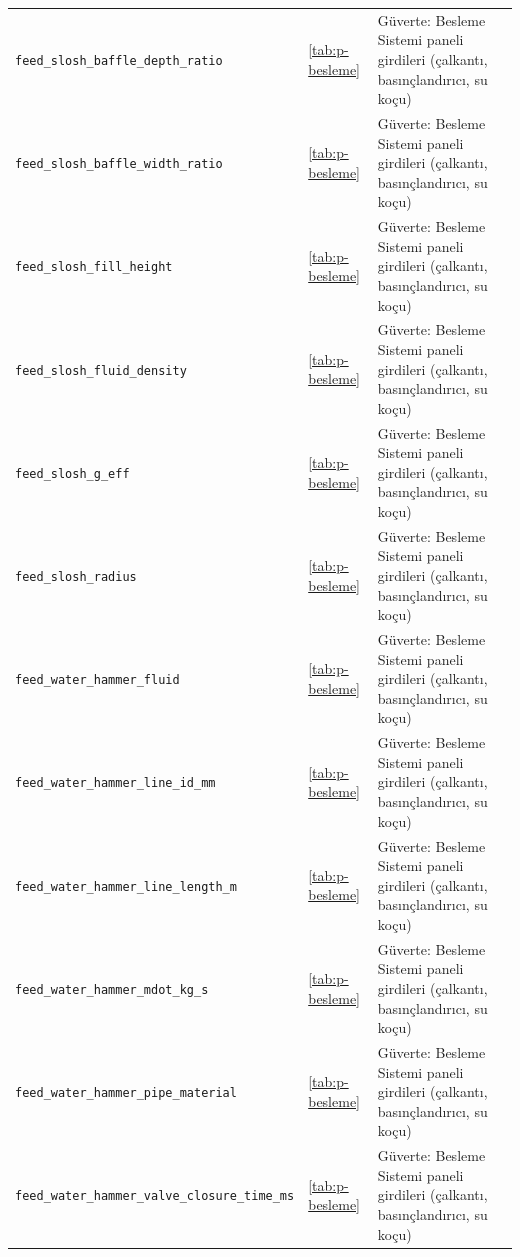 \documentclass[11pt,a4paper]{article}
\begin{document}
{\begin{longtable}{@{}>{\raggedright\arraybackslash}p{5.2cm}p{1.4cm}>{\raggedright\arraybackslash}p{7.4cm}@{}}
\texttt{feed\_\allowbreak{}slosh\_\allowbreak{}baffle\_\allowbreak{}depth\_\allowbreak{}ratio} & \ref{tab:p-besleme} & Güverte: Besleme Sistemi paneli girdileri (çalkantı, basınçlandırıcı, su koçu) \\
\texttt{feed\_\allowbreak{}slosh\_\allowbreak{}baffle\_\allowbreak{}width\_\allowbreak{}ratio} & \ref{tab:p-besleme} & Güverte: Besleme Sistemi paneli girdileri (çalkantı, basınçlandırıcı, su koçu) \\
\texttt{feed\_\allowbreak{}slosh\_\allowbreak{}fill\_\allowbreak{}height} & \ref{tab:p-besleme} & Güverte: Besleme Sistemi paneli girdileri (çalkantı, basınçlandırıcı, su koçu) \\
\texttt{feed\_\allowbreak{}slosh\_\allowbreak{}fluid\_\allowbreak{}density} & \ref{tab:p-besleme} & Güverte: Besleme Sistemi paneli girdileri (çalkantı, basınçlandırıcı, su koçu) \\
\texttt{feed\_\allowbreak{}slosh\_\allowbreak{}g\_\allowbreak{}eff} & \ref{tab:p-besleme} & Güverte: Besleme Sistemi paneli girdileri (çalkantı, basınçlandırıcı, su koçu) \\
\texttt{feed\_\allowbreak{}slosh\_\allowbreak{}radius} & \ref{tab:p-besleme} & Güverte: Besleme Sistemi paneli girdileri (çalkantı, basınçlandırıcı, su koçu) \\
\texttt{feed\_\allowbreak{}water\_\allowbreak{}hammer\_\allowbreak{}fluid} & \ref{tab:p-besleme} & Güverte: Besleme Sistemi paneli girdileri (çalkantı, basınçlandırıcı, su koçu) \\
\texttt{feed\_\allowbreak{}water\_\allowbreak{}hammer\_\allowbreak{}line\_\allowbreak{}id\_\allowbreak{}mm} & \ref{tab:p-besleme} & Güverte: Besleme Sistemi paneli girdileri (çalkantı, basınçlandırıcı, su koçu) \\
\texttt{feed\_\allowbreak{}water\_\allowbreak{}hammer\_\allowbreak{}line\_\allowbreak{}length\_\allowbreak{}m} & \ref{tab:p-besleme} & Güverte: Besleme Sistemi paneli girdileri (çalkantı, basınçlandırıcı, su koçu) \\
\texttt{feed\_\allowbreak{}water\_\allowbreak{}hammer\_\allowbreak{}mdot\_\allowbreak{}kg\_\allowbreak{}s} & \ref{tab:p-besleme} & Güverte: Besleme Sistemi paneli girdileri (çalkantı, basınçlandırıcı, su koçu) \\
\texttt{feed\_\allowbreak{}water\_\allowbreak{}hammer\_\allowbreak{}pipe\_\allowbreak{}material} & \ref{tab:p-besleme} & Güverte: Besleme Sistemi paneli girdileri (çalkantı, basınçlandırıcı, su koçu) \\
\texttt{feed\_\allowbreak{}water\_\allowbreak{}hammer\_\allowbreak{}valve\_\allowbreak{}closure\_\allowbreak{}time\_\allowbreak{}ms} & \ref{tab:p-besleme} & Güverte: Besleme Sistemi paneli girdileri (çalkantı, basınçlandırıcı, su koçu) \\

\end{longtable}}
\end{document}
